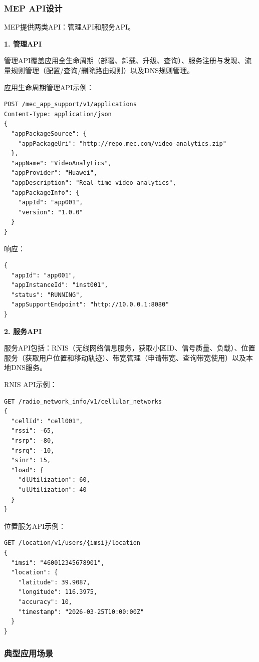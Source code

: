 \subsubsection{MEP API设计}

MEP提供两类API：管理API和服务API。

\textbf{1. 管理API}

管理API覆盖应用全生命周期（部署、卸载、升级、查询）、服务注册与发现、流量规则管理（配置/查询/删除路由规则）以及DNS规则管理。

应用生命周期管理API示例：

\begin{verbatim}
POST /mec_app_support/v1/applications
Content-Type: application/json
{
  "appPackageSource": {
    "appPackageUri": "http://repo.mec.com/video-analytics.zip"
  },
  "appName": "VideoAnalytics",
  "appProvider": "Huawei",
  "appDescription": "Real-time video analytics",
  "appPackageInfo": {
    "appId": "app001",
    "version": "1.0.0"
  }
}
\end{verbatim}

响应：

\begin{verbatim}
{
  "appId": "app001",
  "appInstanceId": "inst001",
  "status": "RUNNING",
  "appSupportEndpoint": "http://10.0.0.1:8080"
}
\end{verbatim}

\textbf{2. 服务API}

服务API包括：RNIS（无线网络信息服务，获取小区ID、信号质量、负载）、位置服务（获取用户位置和移动轨迹）、带宽管理（申请带宽、查询带宽使用）以及本地DNS服务。

RNIS API示例：

\begin{verbatim}
GET /radio_network_info/v1/cellular_networks
{
  "cellId": "cell001",
  "rssi": -65,
  "rsrp": -80,
  "rsrq": -10,
  "sinr": 15,
  "load": {
    "dlUtilization": 60,
    "ulUtilization": 40
  }
}
\end{verbatim}

位置服务API示例：

\begin{verbatim}
GET /location/v1/users/{imsi}/location
{
  "imsi": "460012345678901",
  "location": {
    "latitude": 39.9087,
    "longitude": 116.3975,
    "accuracy": 10,
    "timestamp": "2026-03-25T10:00:00Z"
  }
}
\end{verbatim}

\subsubsection{典型应用场景}

